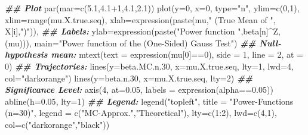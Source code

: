\documentclass[
]{book}
\newenvironment{Shaded}{\begin{snugshade}}{\end{snugshade}}
\newcommand{\AttributeTok}[1]{\textcolor[rgb]{0.77,0.63,0.00}{#1}}
\newcommand{\DecValTok}[1]{\textcolor[rgb]{0.00,0.00,0.81}{#1}}
\newcommand{\DocumentationTok}[1]{\textcolor[rgb]{0.56,0.35,0.01}{\textbf{\textit{#1}}}}
\newcommand{\FloatTok}[1]{\textcolor[rgb]{0.00,0.00,0.81}{#1}}
\newcommand{\FunctionTok}[1]{\textcolor[rgb]{0.00,0.00,0.00}{#1}}
\newcommand{\NormalTok}[1]{#1}
\newcommand{\SpecialCharTok}[1]{\textcolor[rgb]{0.00,0.00,0.00}{#1}}
\newcommand{\StringTok}[1]{\textcolor[rgb]{0.31,0.60,0.02}{#1}}
\begin{document}
\begin{Shaded}
\begin{Highlighting}[]
\DocumentationTok{\#\# Plot}
\FunctionTok{par}\NormalTok{(}\AttributeTok{mar=}\FunctionTok{c}\NormalTok{(}\FloatTok{5.1}\NormalTok{,}\FloatTok{4.1}\SpecialCharTok{+}\DecValTok{1}\NormalTok{,}\FloatTok{4.1}\NormalTok{,}\FloatTok{2.1}\NormalTok{))}
\FunctionTok{plot}\NormalTok{(}\AttributeTok{y=}\DecValTok{0}\NormalTok{, }\AttributeTok{x=}\DecValTok{0}\NormalTok{, }\AttributeTok{type=}\StringTok{"n"}\NormalTok{,}
     \AttributeTok{ylim=}\FunctionTok{c}\NormalTok{(}\DecValTok{0}\NormalTok{,}\DecValTok{1}\NormalTok{),}
     \AttributeTok{xlim=}\FunctionTok{range}\NormalTok{(mu.X.true.seq), }
     \AttributeTok{xlab=}\FunctionTok{expression}\NormalTok{(}\FunctionTok{paste}\NormalTok{(mu,}\StringTok{" (True Mean of "}\NormalTok{, X[i],}\StringTok{")"}\NormalTok{)), }
     \DocumentationTok{\#\# Labels:}
     \AttributeTok{ylab=}\FunctionTok{expression}\NormalTok{(}\FunctionTok{paste}\NormalTok{(}\StringTok{"Power function "}\NormalTok{,beta[n]}\SpecialCharTok{\^{}}\NormalTok{Z,(mu))), }
     \AttributeTok{main=}\StringTok{"Power function of the (One{-}Sided) Gauss Test"}\NormalTok{)}
\DocumentationTok{\#\# Null{-}hypothesis mean:}
\FunctionTok{mtext}\NormalTok{(}\AttributeTok{text =} \FunctionTok{expression}\NormalTok{(mu[}\DecValTok{0}\NormalTok{]}\SpecialCharTok{==}\DecValTok{0}\NormalTok{), }\AttributeTok{side =} \DecValTok{1}\NormalTok{, }\AttributeTok{line =} \DecValTok{2}\NormalTok{, }\AttributeTok{at =} \DecValTok{0}\NormalTok{)}
\DocumentationTok{\#\# Trajectories:}
\FunctionTok{lines}\NormalTok{(}\AttributeTok{y=}\NormalTok{beta.MC.n}\FloatTok{.30}\NormalTok{, }\AttributeTok{x=}\NormalTok{mu.X.true.seq, }\AttributeTok{lty=}\DecValTok{1}\NormalTok{, }\AttributeTok{lwd=}\DecValTok{4}\NormalTok{, }\AttributeTok{col=}\StringTok{"darkorange"}\NormalTok{)}
\FunctionTok{lines}\NormalTok{(}\AttributeTok{y=}\NormalTok{beta.n}\FloatTok{.30}\NormalTok{,    }\AttributeTok{x=}\NormalTok{mu.X.true.seq, }\AttributeTok{lty=}\DecValTok{2}\NormalTok{)}
\DocumentationTok{\#\# Significance Level:}
\FunctionTok{axis}\NormalTok{(}\DecValTok{4}\NormalTok{, }\AttributeTok{at=}\FloatTok{0.05}\NormalTok{, }\AttributeTok{labels =} \FunctionTok{expression}\NormalTok{(alpha}\SpecialCharTok{==}\FloatTok{0.05}\NormalTok{))}
\FunctionTok{abline}\NormalTok{(}\AttributeTok{h=}\FloatTok{0.05}\NormalTok{, }\AttributeTok{lty=}\DecValTok{1}\NormalTok{)}
\DocumentationTok{\#\# Legend:}
\FunctionTok{legend}\NormalTok{(}\StringTok{"topleft"}\NormalTok{, }\AttributeTok{title =} \StringTok{"Power{-}Functions (n=30)"}\NormalTok{, }
       \AttributeTok{legend =} \FunctionTok{c}\NormalTok{(}\StringTok{"MC{-}Approx."}\NormalTok{,}\StringTok{"Theoretical"}\NormalTok{), }
       \AttributeTok{lty=}\FunctionTok{c}\NormalTok{(}\DecValTok{1}\SpecialCharTok{:}\DecValTok{2}\NormalTok{), }\AttributeTok{lwd=}\FunctionTok{c}\NormalTok{(}\DecValTok{4}\NormalTok{,}\DecValTok{1}\NormalTok{), }\AttributeTok{col=}\FunctionTok{c}\NormalTok{(}\StringTok{"darkorange"}\NormalTok{,}\StringTok{"black"}\NormalTok{))}
\end{Highlighting}
\end{Shaded}
\end{document}
